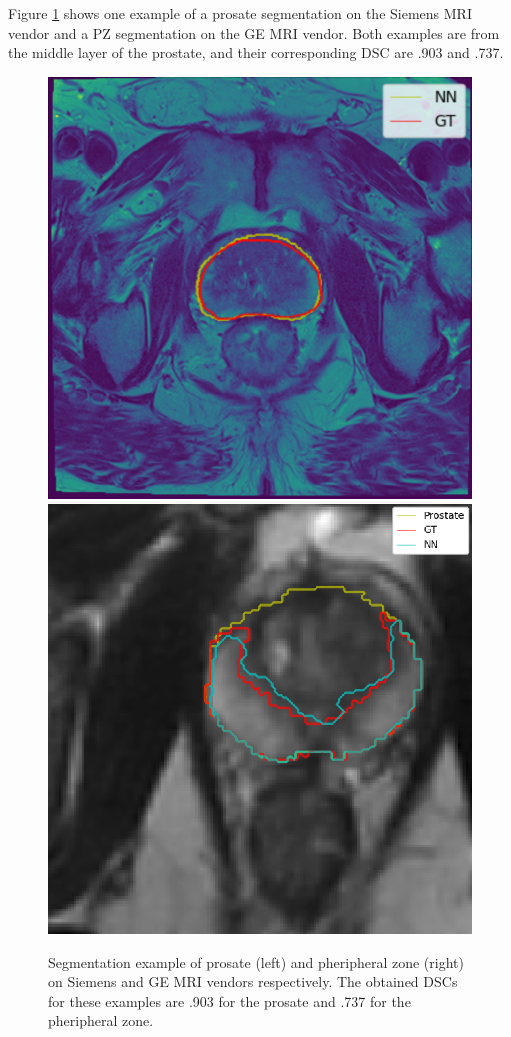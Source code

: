 Figure \ref{fig:resseg} shows one example of a prosate segmentation on the
Siemens MRI vendor and a PZ segmentation on the GE MRI vendor. Both examples
are from the middle layer of the prostate, and their corresponding DSC are .903 and
.737.
\begin{figure}[h]
    \centering
    \includegraphics[totalheight=.18\textheight]{imgs/results/prosate.png}
    \includegraphics[totalheight=.18\textheight]{imgs/results/pz.png}
    \caption{Segmentation example of prosate (left) and pheripheral zone (right) on Siemens and GE
        MRI vendors respectively. The obtained DSCs for these examples are .903 for the prosate
        and .737 for the pheripheral zone.}
    \label{fig:resseg}
\end{figure}
